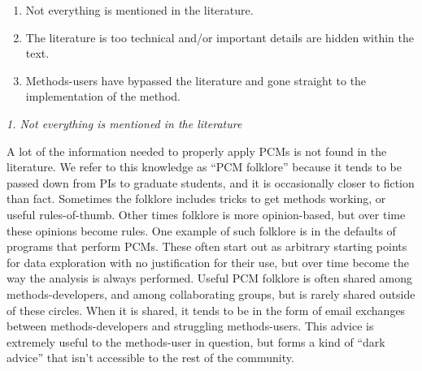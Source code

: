 \documentclass[a4paper,12pt]{article}
\renewcommand{\subsection}[1]{
  \bigskip
  \begin{center}
  \begin{large}
  \normalfont\itshape #1
  \end{large}
  \end{center}
}
\begin{document}
\begin{enumerate}
\item Not everything is mentioned in the literature.
\item The literature is too technical and/or important details are hidden within the text.
\item Methods-users have bypassed the literature and gone straight to the implementation of the method.
\end{enumerate}


\subsection{1. Not everything is mentioned in the literature}
A lot of the information needed to properly apply PCMs is not found in the literature. 
We refer to this knowledge as ``PCM folklore'' because it tends to be passed down from PIs to graduate students, and it is occasionally closer to fiction than fact.
Sometimes the folklore includes tricks to get methods working, or useful rules-of-thumb. 
Other times folklore is more opinion-based, but over time these opinions become rules. 
One example of such folklore is in the defaults of programs that perform PCMs. 
These often start out as arbitrary starting points for data exploration with no justification for their use, but over time become the way the analysis is always performed.
Useful PCM folklore is often shared among methods-developers, and among collaborating groups, but is rarely shared outside of these circles. 
When it is shared, it tends to be in the form of email exchanges between methods-developers and struggling methods-users.
This advice is extremely useful to the methods-user in question, but forms a kind of ``dark advice'' that isn't accessible to the rest of the community.\\

\end{document}
